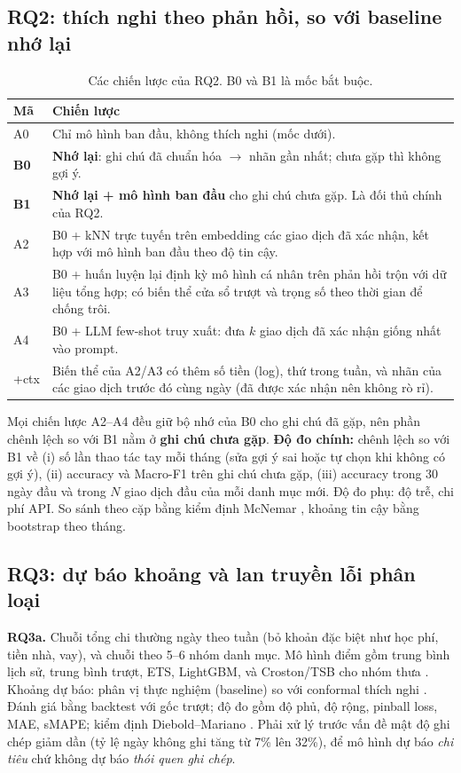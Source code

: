 \documentclass[12pt,a4paper]{article}
\begin{document}
\subsection{RQ2: thích nghi theo phản hồi, so với baseline nhớ lại}
\begin{table}[H]
\centering\small
\caption{Các chiến lược của RQ2. B0 và B1 là mốc bắt buộc.}
\begin{tabularx}{\linewidth}{l L}
\toprule
Mã & Chiến lược \\
\midrule
A0 & Chỉ mô hình ban đầu, không thích nghi (mốc dưới). \\
\textbf{B0} & \textbf{Nhớ lại}: ghi chú đã chuẩn hóa $\to$ nhãn gần nhất; chưa gặp thì không gợi ý. \\
\textbf{B1} & \textbf{Nhớ lại + mô hình ban đầu} cho ghi chú chưa gặp. Là đối thủ chính của RQ2. \\
A2 & B0 + kNN trực tuyến trên embedding các giao dịch đã xác nhận, kết hợp với mô hình ban đầu theo độ tin cậy. \\
A3 & B0 + huấn luyện lại định kỳ mô hình cá nhân trên phản hồi trộn với dữ liệu tổng hợp; có biến thể cửa sổ trượt và trọng số theo thời gian để chống trôi. \\
A4 & B0 + LLM few-shot truy xuất: đưa $k$ giao dịch đã xác nhận giống nhất vào prompt. \\
+ctx & Biến thể của A2/A3 có thêm số tiền (log), thứ trong tuần, và nhãn của các giao dịch trước đó cùng ngày (đã được xác nhận nên không rò rỉ). \\
\bottomrule
\end{tabularx}
\end{table}
Mọi chiến lược A2--A4 đều giữ bộ nhớ của B0 cho ghi chú đã gặp, nên phần chênh lệch so với B1 nằm ở \textbf{ghi chú chưa gặp}. \textbf{Độ đo chính:} chênh lệch so với B1 về (i) số lần thao tác tay mỗi tháng (sửa gợi ý sai hoặc tự chọn khi không có gợi ý), (ii) accuracy và Macro-F1 trên ghi chú chưa gặp, (iii) accuracy trong 30 ngày đầu và trong $N$ giao dịch đầu của mỗi danh mục mới. Độ đo phụ: độ trễ, chi phí API. So sánh theo cặp bằng kiểm định McNemar \citep{dietterich1998tests}, khoảng tin cậy bằng bootstrap theo tháng.

\subsection{RQ3: dự báo khoảng và lan truyền lỗi phân loại}
\textbf{RQ3a.} Chuỗi tổng chi thường ngày theo tuần (bỏ khoản đặc biệt như học phí, tiền nhà, vay), và chuỗi theo 5--6 nhóm danh mục. Mô hình điểm gồm trung bình lịch sử, trung bình trượt, ETS, LightGBM, và Croston/TSB cho nhóm thưa \citep{croston1972,teunter2011tsb}. Khoảng dự báo: phân vị thực nghiệm (baseline) so với conformal thích nghi \citep{gibbs2021aci}. Đánh giá bằng backtest với gốc trượt; độ đo gồm độ phủ, độ rộng, pinball loss, MAE, sMAPE; kiểm định Diebold--Mariano \citep{diebold1995comparing}. Phải xử lý trước vấn đề mật độ ghi chép giảm dần (tỷ lệ ngày không ghi tăng từ 7\% lên 32\%), để mô hình dự báo \emph{chi tiêu} chứ không dự báo \emph{thói quen ghi chép}.
\end{document}
